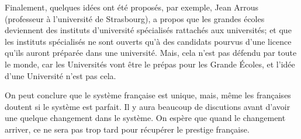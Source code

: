 \documentclass[a4paper,11pt]{article}
\begin{document}
Finalement, quelques idées ont été proposés, par exemple, Jean Arrous (professeur à l'université de Strasbourg), a propos que les grandes écoles deviennent des instituts d'université spécialisés rattachés aux universités; et que les instituts spécialisés ne sont ouverts qu'à des candidats pourvus d'une licence qu'ils auront préparée dans une université. Mais, cela n'est pas défendu par toute le monde, car les Universités vont être le prépas pour les Grande Écoles, et l'idée d'une Université n'est pas cela.




On peut conclure que le système française est unique, mais, même les françaises doutent si le système est parfait.
Il y aura beaucoup de discutions avant d'avoir une quelque changement dans le système. On espère que quand le changement arriver, ce ne sera pas trop tard pour récupérer le prestige française.





\end{document}
